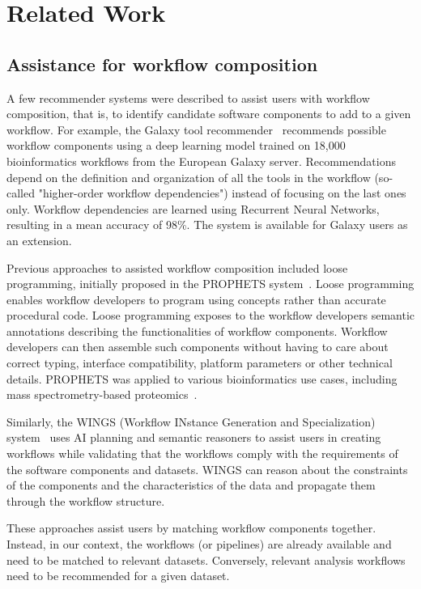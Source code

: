 \documentclass[conference]{IEEEtran}
\begin{document}
\section{Related Work}
    

    
\subsection{Assistance for workflow composition}

A few recommender systems were described to assist users with workflow composition, that is, 
to identify candidate software components to add to a given workflow. For example, the Galaxy tool recommender~\cite{kumar2021tool} recommends possible workflow components using a deep learning model trained on 18,000 bioinformatics workflows from the European Galaxy server. Recommendations depend on the definition and organization of all the tools in the workflow (so-called "higher-order workflow dependencies") instead of focusing on the last ones only. Workflow dependencies are learned using Recurrent Neural Networks, resulting in a mean accuracy of 98\%. The system is available for Galaxy users as an extension. 

Previous approaches to assisted workflow composition included loose programming, initially proposed 
in the PROPHETS system~\cite{lamprecht2010synthesis}\cite{naujokat2012loose}\cite{lamprecht2013user}. Loose programming enables workflow developers to 
program using concepts rather than accurate procedural code. Loose programming exposes to the workflow developers semantic annotations describing the functionalities of workflow components. Workflow developers can then assemble such components without having to care about correct typing, interface compatibility, platform parameters or other technical details.  
PROPHETS was applied to various bioinformatics use cases, including 
mass spectrometry-based proteomics~\cite{palmblad2019automated}.

Similarly, the WINGS (Workflow INstance Generation and Specialization) system~\cite{gil2010wings} uses AI planning and semantic reasoners to assist users in creating workflows while validating that the workflows comply with the requirements of the software components and datasets. WINGS can reason about the constraints of the components and the characteristics of the data and propagate them through the workflow structure.

These approaches assist users by matching workflow components together. Instead, in our context, the workflows (or pipelines) are already available and need to be matched to relevant datasets. Conversely, relevant analysis workflows need to be recommended for a given dataset.
\end{document}
